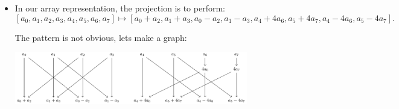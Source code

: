 \begin{frame}
    \begin{itemize}
        \item In our array representation, the projection is to perform:
        \[ 
            [a_{0}, a_{1}, a_{2}, a_{3}, a_{4}, a_{5}, a_{6}, a_{7}] \mapsto [a_{0} + a_{2}, a_{1} + a_{3}, a_{0} - a_{2}, a_{1} - a_{3}, a_{4} + 4a_{6}, a_{5} + 4a_{7}, a_{4} - 4a_{6}, a_{5} - 4a_{7}].
        \]
    
        The pattern is not obvious, lets make a graph: 
        \begin{center}
            \includegraphics[width=0.8\textwidth]{figures/compiled/tikzcd3.pdf}
        \end{center}

    \end{itemize}
\end{frame}

